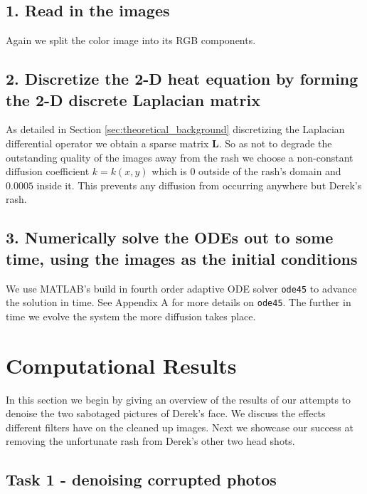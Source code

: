 \documentclass[fleqn,10pt]{../SelfArx} %
\begin{document}
\subsection*{1. Read in the images}
Again we split the color image into its RGB components.

\subsection*{2. Discretize the 2-D heat equation by forming the 2-D discrete Laplacian matrix}
As detailed in Section \ref{sec:theoretical_background} discretizing the Laplacian differential operator we obtain a sparse matrix $\boldsymbol{L}$. So as not to degrade the outstanding quality of the images away from the rash we choose a non-constant diffusion coefficient $k = k(x,y)$ which is 0 outside of the rash's domain and $0.0005$ inside it. This prevents any diffusion from occurring anywhere but Derek's rash.

\subsection*{3. Numerically solve the ODEs out to some time, using the images as the initial conditions}
We use MATLAB's build in fourth order adaptive ODE solver \texttt{ode45} to advance the solution in time. See Appendix A for more details on \texttt{ode45}.
The further in time we evolve the system the more diffusion takes place.



\section{Computational Results} %
\label{sec:computational_results}
In this section we begin by giving an overview of the results of our attempts to denoise the two sabotaged pictures of Derek's face. We discuss the effects different filters have on the cleaned up images. Next we showcase our success at removing the unfortunate rash from Derek's other two head shots.
\subsection{Task 1 - denoising corrupted photos}
\end{document}
